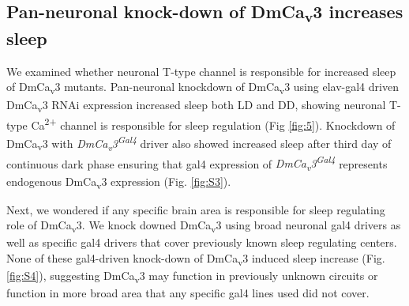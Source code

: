\subsection*{Pan-neuronal knock-down of DmCa\textsubscript{v}3 increases sleep}

We examined whether neuronal T-type channel is responsible for increased sleep of DmCa\textsubscript{v}3 mutants.
Pan-neuronal knockdown of DmCa\textsubscript{v}3 using elav-gal4 driven DmCa\textsubscript{v}3 RNAi expression increased sleep both LD and DD, showing neuronal T-type Ca\textsuperscript{2+} channel is responsible for sleep regulation (Fig \ref{fig:5}).
Knockdown of DmCa\textsubscript{v}3 with \emph{DmCa\textsubscript{v}3\textsuperscript{Gal4}} driver also showed increased sleep after third day of continuous dark phase ensuring that gal4 expression of \emph{DmCa\textsubscript{v}3\textsuperscript{Gal4}} represents endogenous DmCa\textsubscript{v}3 expression (Fig. \ref{fig:S3}). 

Next, we wondered if any specific brain area is responsible for sleep regulating role of DmCa\textsubscript{v}3.
We knock downed DmCa\textsubscript{v}3 using broad neuronal gal4 drivers as well as specific gal4 drivers that cover previously known sleep regulating centers.
None of these gal4-driven knock-down of DmCa\textsubscript{v}3 induced sleep increase (Fig. \ref{fig:S4}), suggesting DmCa\textsubscript{v}3 may function in previously unknown circuits or function in more broad area that any specific gal4 lines used did not cover.  
    
  
  